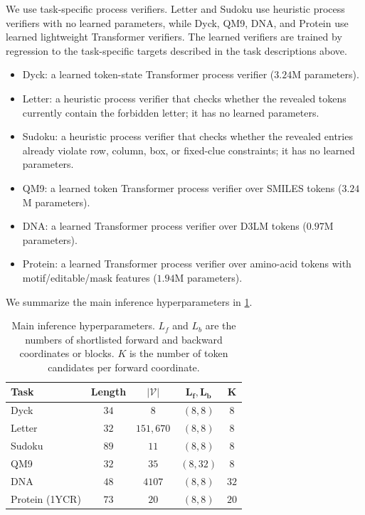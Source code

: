 \documentclass{article}
\numberwithin{theorem}{section}
\numberwithin{proposition}{section}
\numberwithin{corollary}{section}
\numberwithin{lemma}{section}
\numberwithin{conjecture}{section}
\numberwithin{remark}{section}
\numberwithin{definition}{section}
\numberwithin{assumption}{section}
\numberwithin{example}{section}
\newcommand{\abs}[1]{\left| #1\right|}
\begin{document}
We use task-specific process verifiers. Letter and Sudoku use heuristic process verifiers with no learned parameters, while Dyck, QM9, DNA, and Protein use learned lightweight Transformer verifiers. The learned verifiers are trained by regression to the task-specific targets described in the task descriptions above.
\begin{itemize}[leftmargin=15pt]
    \item Dyck: a learned token-state Transformer process verifier ($3.24$M parameters).
    \item Letter: a heuristic process verifier that checks whether the revealed tokens currently contain the forbidden letter; it has no learned parameters.
    \item Sudoku: a heuristic process verifier that checks whether the revealed entries already violate row, column, box, or fixed-clue constraints; it has no learned parameters.
    \item QM9: a learned token Transformer process verifier over SMILES tokens ($3.24$M parameters).
    \item DNA: a learned Transformer process verifier over D3LM tokens ($0.97$M parameters).
    \item Protein: a learned Transformer process verifier over amino-acid tokens with motif/editable/mask features ($1.94$M parameters).
\end{itemize}

We summarize the main inference hyperparameters in \cref{tab:hyperparameter_grid}.

\begin{table}[h!]
\centering
\setlength{\tabcolsep}{3.0pt}
\renewcommand{\arraystretch}{1.12}
\begin{tabular}{l c c c c}
\toprule
\textbf{Task}
& \textbf{Length}
& $\boldsymbol{\abs{\mathcal V}}$
& $\boldsymbol{L_f,L_b}$
& $\boldsymbol{K}$ \\
\midrule
Dyck & $34$ & $8$ & $(8,8)$ & $8$ \\
Letter & $32$ & $151{,}670$ & $(8,8)$ & $8$ \\
Sudoku & $89$ & $11$ & $(8,8)$ & $8$ \\
QM9 & $32$ & $35$ & $(8,32)$ & $8$ \\
DNA & $48$ & $4107$ & $(8,8)$ & $32$ \\
Protein (1YCR) & $73$ & $20$ & $(8,8)$ & $20$ \\
\bottomrule
\end{tabular}
\vspace{5pt}
\caption{
Main inference hyperparameters. $L_f$ and $L_b$ are the numbers of shortlisted forward and backward coordinates or blocks. $K$ is the number of token candidates per forward coordinate.
}
\label{tab:hyperparameter_grid}
\end{table}
\end{document}
